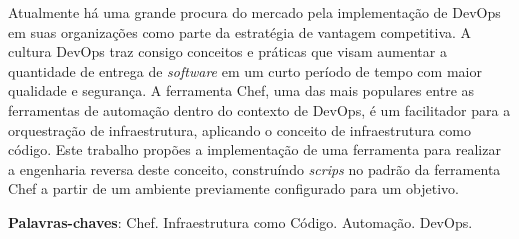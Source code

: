 \newpage\null\thispagestyle{empty}\newpage
\begin{resumo}
  Atualmente há uma grande procura do mercado pela implementação de
  DevOps em suas organizações como parte da estratégia de vantagem
  competitiva. A cultura DevOps traz consigo conceitos e práticas
  que visam aumentar a quantidade de entrega de \textit{software} em um
  curto período de tempo com maior qualidade e segurança. A
  ferramenta Chef, uma das mais populares entre as ferramentas de
  automação dentro do contexto de DevOps, é um facilitador para
  a orquestração de infraestrutura, aplicando o conceito de
  infraestrutura como código. Este trabalho propões a implementação
  de uma ferramenta para realizar a engenharia reversa deste conceito,
  construíndo \textit{scrips} no padrão da ferramenta Chef a partir de um ambiente
  previamente configurado para um objetivo.

  \vspace{\onelineskip}
  \noindent
   \textbf{Palavras-chaves}: Chef. Infraestrutura como Código. Automação. DevOps.
\end{resumo}
